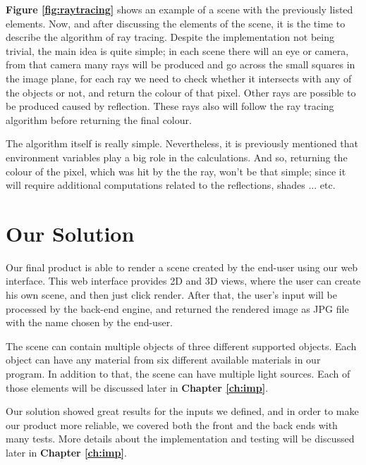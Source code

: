 \documentclass[a4paper]{report}
\begin{document}
	\par \textbf{Figure \ref{fig:raytracing}} shows an example of a scene with the previously listed elements. Now, and after discussing the elements of the scene, it is the time to describe the algorithm of ray tracing. Despite the implementation not being trivial, the main idea is quite simple; in each scene there will an eye or camera, from that camera many rays will be produced and go across the small squares in the image plane, for each ray we need to check whether it intersects with any of the objects or not, and return the colour of that pixel. Other rays are possible to be produced caused by reflection. These rays also will follow the ray tracing algorithm before returning the final colour.\\
	\par The algorithm itself is really simple. Nevertheless, it is previously mentioned that environment variables play a big role in the calculations. And so, returning the colour of the pixel, which was hit by the the ray, won't be that simple; since it will require additional computations related to the reflections, shades ... etc. 
	\section{Our Solution}
	Our final product is able to render a scene created by the end-user using our web interface. This web interface provides 2D and 3D views, where the user can create his own scene, and then just click render. After that, the user's input will be processed by the back-end engine, and returned the rendered image as JPG file with the name chosen by the end-user.\\ 
	\par The scene can contain multiple objects of three different supported objects. Each object can have any material from six different available materials in our program. In addition to that, the scene can have multiple light sources. Each of those elements will be discussed later in \textbf{Chapter \ref{ch:imp}}.\\
	\par Our solution showed great results for the inputs we defined, and in order to make our product more reliable, we covered both the front and the back ends with many tests. More details about the implementation and testing will be discussed later in \textbf{Chapter \ref{ch:imp}}.
\end{document}
